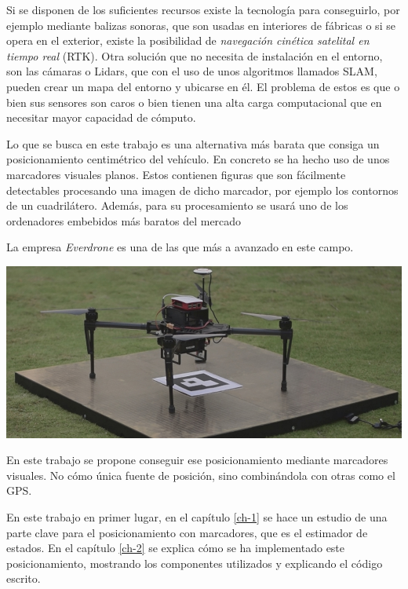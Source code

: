 Si se disponen de los suficientes recursos existe la tecnología para conseguirlo, por ejemplo mediante balizas sonoras, que son usadas en interiores de fábricas o si se opera en el exterior, existe la posibilidad de  \textit{navegación cinética satelital en tiempo real} (RTK). Otra solución que no necesita de instalación en el entorno, son las cámaras o Lidars, que con el uso de unos algoritmos llamados SLAM, pueden crear un mapa del entorno y ubicarse en él. El problema de estos es que o bien sus sensores son caros o bien tienen una alta carga computacional que en necesitar mayor capacidad de cómputo. 

Lo que se busca en este trabajo es una alternativa más barata que consiga un posicionamiento centimétrico del vehículo. En concreto se ha hecho uso de unos marcadores visuales planos. Estos contienen figuras que son fácilmente detectables procesando una imagen de dicho marcador, por ejemplo los contornos de un cuadrilátero. Además, para su procesamiento se usará uno de los ordenadores embebidos más baratos del mercado 

 
La empresa \textit{Everdrone} es una de las que más a avanzado en este campo. 


\includegraphics[width=\textwidth]{introduccion/flytbase.jpg}


En este trabajo se propone conseguir ese posicionamiento mediante marcadores visuales. No cómo única fuente de posición, sino combinándola con otras como el GPS.

En este trabajo en primer lugar, en el capítulo \ref{ch-1} se hace un estudio de una parte clave para el posicionamiento con marcadores, que es el estimador de estados.  
En el capítulo \ref{ch-2} se explica cómo se ha implementado este posicionamiento, mostrando los componentes utilizados y explicando el código escrito.




\endinput
